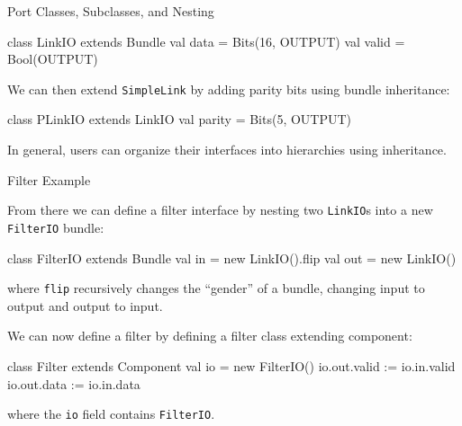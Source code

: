 \documentclass[xcolor=pdflatex,dvipsnames,table]{beamer}
\begin{document}
% 
% 

\begin{frame}[fragile]{Port Classes, Subclasses, and Nesting}

\begin{scala}
class LinkIO extends Bundle { 
  val data  = Bits(16, OUTPUT) 
  val valid = Bool(OUTPUT)
}
\end{scala}

\noindent
We can then extend \verb+SimpleLink+ by adding parity bits using
bundle inheritance:

\begin{scala}
class PLinkIO extends LinkIO { 
  val parity = Bits(5, OUTPUT) 
}
\end{scala}

\noindent
In general, users can organize their interfaces into hierarchies using inheritance.  

\end{frame}

\begin{frame}[fragile]{Filter Example}

From there we can define a filter interface by nesting two
\verb+LinkIO+s into a new \verb+FilterIO+ bundle:

\begin{scala}
class FilterIO extends Bundle { 
  val in  = new LinkIO().flip
  val out = new LinkIO()
}
\end{scala}

\noindent
where \verb+flip+ recursively changes the ``gender'' of a bundle,
changing input to output and output to input.

We can now define a filter by defining a filter class extending component:

\begin{scala}
class Filter extends Component { 
  val io  = new FilterIO()
  io.out.valid := io.in.valid
  io.out.data  := io.in.data
}
\end{scala}

\noindent 
where the \verb+io+ field contains \verb+FilterIO+. 

\end{frame}
\end{document}
